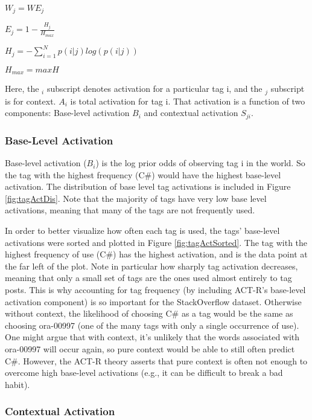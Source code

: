 \documentclass[10pt,letterpaper]{article}
\begin{document}
$W_{j} = WE_{j}$

$E_{j} = 1-\frac{H_{j}}{H_{max}}$

$H_{j} = -\sum_{i=1}^{N}p(i|j)log\left (  p(i|j) \right )$

$H_{max} = maxH$

Here, the $_{i}$ subscript denotes activation for a particular tag i, and the $_{j}$ subscript is for context.
$A_{i}$ is total activation for tag i.
That activation is a function of two components: Base-level activation $B_{i}$ and contextual activation $S_{ji}$.

\subsubsection{Base-Level Activation}

Base-level activation ($B_{i}$) is the log prior odds of observing tag i in the world.
So the tag with the highest frequency (C\#) would have the highest base-level activation.
The distribution of base level tag activations is included in Figure \ref{fig:tagActDis}.
Note that the majority of tags have very low base level activations, meaning that many of the tags are not frequently used.

In order to better visualize how often each tag is used, the tags' base-level activations were sorted and plotted in Figure \ref{fig:tagActSorted}.
The tag with the highest frequency of use (C\#) has the highest activation, and is the data point at the far left of the plot.
Note in particular how sharply tag activation decreases, meaning that only a small set of tags are the ones used almost entirely to tag posts.
This is why accounting for tag frequency (by including ACT-R's base-level activation component) is so important for the StackOverflow dataset.
Otherwise without context, the likelihood of choosing C\# as a tag would be the same as choosing ora-00997 (one of the many tags with only a single occurrence of use).
One might argue that with context, it's unlikely that the words associated with ora-00997 will occur again, so pure context would be able to still often predict C\#.
However, the ACT-R theory asserts that pure context is often not enough to overcome high base-level activations (e.g., it can be difficult to break a bad habit).

\subsubsection{Contextual Activation}
\end{document}
